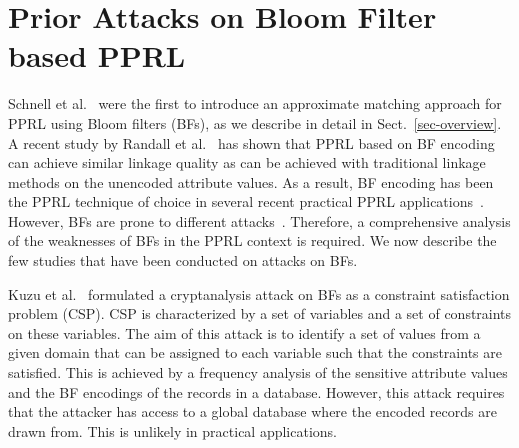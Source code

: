 \documentclass{llncs}
\begin{document}


\section{Prior Attacks on Bloom Filter based PPRL}
\label{sec-related}

Schnell et al.~\cite{Sch09} were the first to introduce an
approximate matching approach for PPRL using Bloom filters (BFs), as
we describe in detail in Sect.~\ref{sec-overview}. A recent study by
Randall et al.~\cite{Ran14} has shown that PPRL based on BF encoding
can achieve similar linkage quality as can be achieved with
traditional linkage methods on the unencoded attribute values. As a
result, BF encoding has been the PPRL technique of choice in several
recent practical PPRL applications~\cite{Boy15,Ran14}.
%
%
However, BFs are prone to different
attacks~\cite{Kro15,Kuz11,Kuz13,Nie14}. Therefore, a comprehensive
analysis of the weaknesses of BFs in the PPRL context is required. We
now describe the few studies that have been conducted on attacks on
BFs.


Kuzu et al.~\cite{Kuz11} formulated a cryptanalysis attack on BFs
as a constraint satisfaction problem (CSP). CSP is characterized by
a set of variables and a set of constraints on these variables. The
aim of this attack is to identify a set of values from a given domain
that can be assigned to each variable such that the constraints are
satisfied. This is achieved by a frequency analysis of the sensitive
attribute values and the BF encodings of the records in a database.
However, this attack requires that the attacker has access to a
global database where the encoded records are drawn from. This
is unlikely in practical applications.
\end{document}
